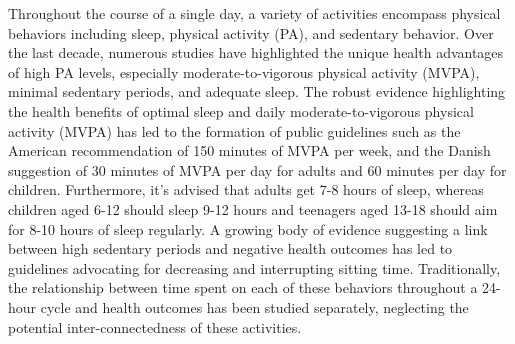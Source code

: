 \documentclass[
  10pt,
  letterpaper,
  DIV=11,
  numbers=noendperiod]{scrartcl}
\begin{document}
Throughout the course of a single day, a variety of activities encompass
physical behaviors including sleep, physical activity (PA), and
sedentary behavior\autocite{rollo_whole_2020}. Over the last decade,
numerous studies have highlighted the unique health advantages of high
PA levels, especially moderate-to-vigorous physical activity
(MVPA)\autocite{kraus_physical_2019,lee_effect_2012}, minimal sedentary
periods\autocite{wilmot_sedentary_2012}, and adequate
sleep\autocite{cappuccio_sleep_2010}. The robust evidence highlighting
the health benefits of optimal sleep and daily moderate-to-vigorous
physical activity (MVPA) has led to the formation of public guidelines
such as the American recommendation of 150 minutes of MVPA per
week\autocite{kl_physical_2018}, and the Danish suggestion of 30 minutes
of MVPA per day for adults\autocite{el-zine_fysisk_voksne} and 60
minutes per day for children\autocite{el-zine_fysisk_børn}. Furthermore,
it's advised that adults get 7-8 hours of
sleep\autocite{consensus_conference_panel_recommended_2015}, whereas
children aged 6-12 should sleep 9-12 hours and teenagers aged 13-18
should aim for 8-10 hours of sleep
regularly\autocite{paruthi_consensus_2016}. A growing body of evidence
suggesting a link between high sedentary periods and negative health
outcomes has led to guidelines advocating for decreasing and
interrupting sitting time\autocite{tremblay_sedentary_2017}.
Traditionally, the relationship between time spent on each of these
behaviors throughout a 24-hour cycle and health outcomes has been
studied separately, neglecting the potential inter-connectedness of
these activities\autocite{rosenberger_24-hour_2019}.
\end{document}
